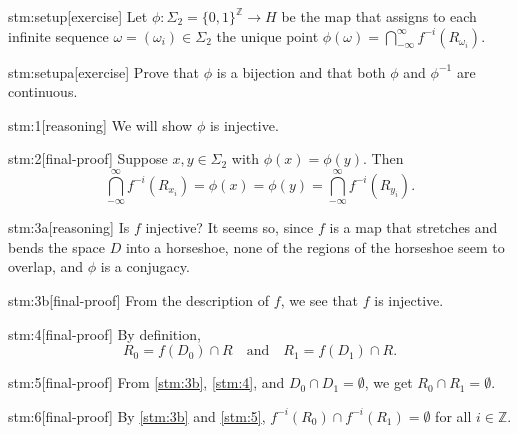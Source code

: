 \documentclass{article}
\begin{document}

\begin{stm}{stm:setup}[exercise]
Let $\phi : \Sigma_2 = \{0,1\}^{\mathbb{Z}} \to H$ be the map that assigns to each infinite sequence $\omega = (\omega_i) \in \Sigma_2$ the unique point $\phi(\omega) = \bigcap_{-\infty}^\infty f^{-i}(R_{\omega_i})$.
\end{stm}

\begin{stm}{stm:setupa}[exercise]
Prove that $\phi$ is a bijection and that both $\phi$ and $\phi^{-1}$ are continuous.
\end{stm}


\begin{stm}{stm:1}[reasoning]
We will show $\phi$ is injective.
\end{stm}

\begin{stm}{stm:2}[final-proof]
Suppose $x, y \in \Sigma_2$ with $\phi(x) = \phi(y)$. Then 
\[
\bigcap_{-\infty}^\infty f^{-i}(R_{x_i}) = \phi(x) = \phi(y) = \bigcap_{-\infty}^\infty f^{-i}(R_{y_i}).
\]
\end{stm}

\begin{stm}{stm:3a}[reasoning]
Is $f$ injective? It seems so, since $f$ is a map that stretches and bends the space $D$ into a horseshoe, none of the regions of the horseshoe seem to overlap, and $\phi$ is a conjugacy.
\end{stm}

\begin{stm}{stm:3b}[final-proof]
From the description of $f$, we see that $f$ is injective.
\end{stm}

\begin{stm}{stm:4}[final-proof]
By definition,
\[
R_0 = f(D_0) \cap R \quad \text{and} \quad R_1 = f(D_1) \cap R.
\]
\end{stm}

\begin{stm}{stm:5}[final-proof]
From \ref{stm:3b}, \ref{stm:4}, and $D_0 \cap D_1 = \emptyset$, we get $R_0 \cap R_1 = \emptyset$.
\end{stm}

\begin{stm}{stm:6}[final-proof]
By \ref{stm:3b} and \ref{stm:5}, $f^{-i}(R_0) \cap f^{-i}(R_1) = \emptyset$ for all $i \in \mathbb{Z}$.
\end{stm}
\end{document}
